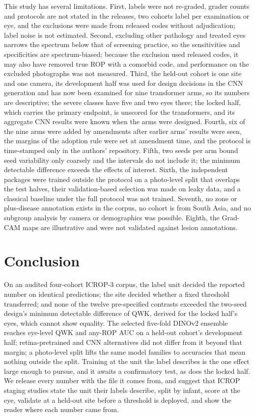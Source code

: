 \documentclass[journal]{IEEEtran}
\begin{document}
This study has several limitations. First, labels were not re-graded, grader counts and protocols are not stated in the releases, two cohorts label per examination or eye, and the exclusions were made from released codes without adjudication; label noise is not estimated. Second, excluding other pathology and treated eyes narrows the spectrum below that of screening practice, so the sensitivities and specificities are spectrum-biased; because the exclusion used released codes, it may also have removed true ROP with a comorbid code, and performance on the excluded photographs was not measured. Third, the held-out cohort is one site and one camera, its development half was used for design decisions in the CNN generation and has now been examined for nine transformer arms, so its numbers are descriptive; the severe classes have five and two eyes there; the locked half, which carries the primary endpoint, is unscored for the transformers, and its aggregate CNN results were known when the arms were designed. Fourth, six of the nine arms were added by amendments after earlier arms' results were seen, the margins of the adoption rule were set at amendment time, and the protocol is time-stamped only in the authors' repository. Fifth, two seeds per arm bound seed variability only coarsely and the intervals do not include it; the minimum detectable difference exceeds the effects of interest. Sixth, the independent packages were trained outside the protocol on a photo-level split that overlaps the test halves, their validation-based selection was made on leaky data, and a classical baseline under the full protocol was not trained. Seventh, no zone or plus-disease annotation exists in the corpus, no cohort is from South Asia, and no subgroup analysis by camera or demographics was possible. Eighth, the Grad-CAM maps are illustrative and were not validated against lesion annotations.

\section{Conclusion}
On an audited four-cohort ICROP-3 corpus, the label unit decided the reported number on identical predictions; the site decided whether a fixed threshold transferred; and none of the twelve pre-specified contrasts exceeded the two-seed design's minimum detectable difference of \mdd{} QWK, derived for the locked half's \lockedEyes{} eyes, which cannot show equality. The selected five-fold DINOv2 ensemble reaches eye-level QWK \BdevQ{} and any-ROP AUC \BdevAUC{} on a held-out cohort's development half; retina-pretrained and CNN alternatives did not differ from it beyond that margin; a photo-level split lifts the same model families to accuracies that mean nothing outside the split. Training at the unit the label describes is the one effect large enough to pursue, and it awaits a confirmatory test, as does the locked half. We release every number with the file it comes from, and suggest that ICROP staging studies state the unit their labels describe, split by infant, score at the eye, validate at a held-out site before a threshold is deployed, and show the reader where each number came from.
\end{document}
